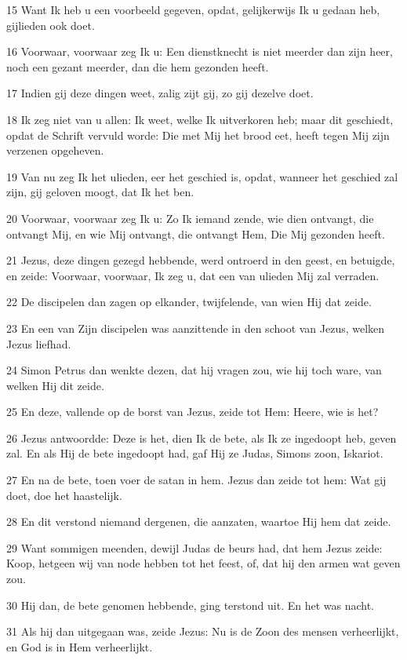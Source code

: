 \par 15 Want Ik heb u een voorbeeld gegeven, opdat, gelijkerwijs Ik u gedaan heb, gijlieden ook doet.
\par 16 Voorwaar, voorwaar zeg Ik u: Een dienstknecht is niet meerder dan zijn heer, noch een gezant meerder, dan die hem gezonden heeft.
\par 17 Indien gij deze dingen weet, zalig zijt gij, zo gij dezelve doet.
\par 18 Ik zeg niet van u allen: Ik weet, welke Ik uitverkoren heb; maar dit geschiedt, opdat de Schrift vervuld worde: Die met Mij het brood eet, heeft tegen Mij zijn verzenen opgeheven.
\par 19 Van nu zeg Ik het ulieden, eer het geschied is, opdat, wanneer het geschied zal zijn, gij geloven moogt, dat Ik het ben.
\par 20 Voorwaar, voorwaar zeg Ik u: Zo Ik iemand zende, wie dien ontvangt, die ontvangt Mij, en wie Mij ontvangt, die ontvangt Hem, Die Mij gezonden heeft.
\par 21 Jezus, deze dingen gezegd hebbende, werd ontroerd in den geest, en betuigde, en zeide: Voorwaar, voorwaar, Ik zeg u, dat een van ulieden Mij zal verraden.
\par 22 De discipelen dan zagen op elkander, twijfelende, van wien Hij dat zeide.
\par 23 En een van Zijn discipelen was aanzittende in den schoot van Jezus, welken Jezus liefhad.
\par 24 Simon Petrus dan wenkte dezen, dat hij vragen zou, wie hij toch ware, van welken Hij dit zeide.
\par 25 En deze, vallende op de borst van Jezus, zeide tot Hem: Heere, wie is het?
\par 26 Jezus antwoordde: Deze is het, dien Ik de bete, als Ik ze ingedoopt heb, geven zal. En als Hij de bete ingedoopt had, gaf Hij ze Judas, Simons zoon, Iskariot.
\par 27 En na de bete, toen voer de satan in hem. Jezus dan zeide tot hem: Wat gij doet, doe het haastelijk.
\par 28 En dit verstond niemand dergenen, die aanzaten, waartoe Hij hem dat zeide.
\par 29 Want sommigen meenden, dewijl Judas de beurs had, dat hem Jezus zeide: Koop, hetgeen wij van node hebben tot het feest, of, dat hij den armen wat geven zou.
\par 30 Hij dan, de bete genomen hebbende, ging terstond uit. En het was nacht.
\par 31 Als hij dan uitgegaan was, zeide Jezus: Nu is de Zoon des mensen verheerlijkt, en God is in Hem verheerlijkt.
